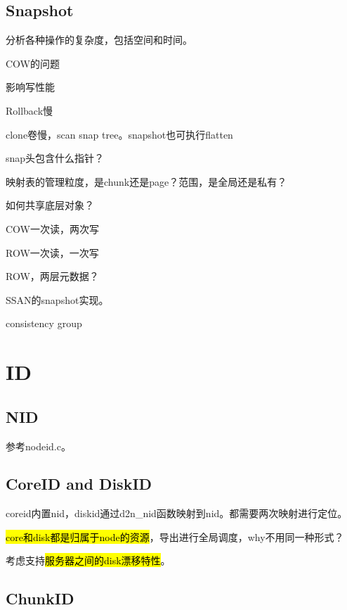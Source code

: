 \subsection{Snapshot}

分析各种操作的复杂度，包括空间和时间。

\hrulefill

COW的问题
\begin{enumbox}
\item 影响写性能
\item Rollback慢
\item clone卷慢，scan snap tree。snapshot也可执行flatten
\end{enumbox}

snap头包含什么指针？

映射表的管理粒度，是chunk还是page？范围，是全局还是私有？

如何共享底层对象？

COW一次读，两次写

ROW一次读，一次写

ROW，两层元数据？

\hrulefill

SSAN的snapshot实现。

consistency group

\section{ID}

\subsection{NID}

参考nodeid.c。

\subsection{CoreID and DiskID}

coreid内置nid，diskid通过d2n\_nid函数映射到nid。都需要两次映射进行定位。

\hl{core和disk都是归属于node的资源}，导出进行全局调度，why不用同一种形式？

考虑支持\hl{服务器之间的disk漂移特性}。

\subsection{ChunkID}


